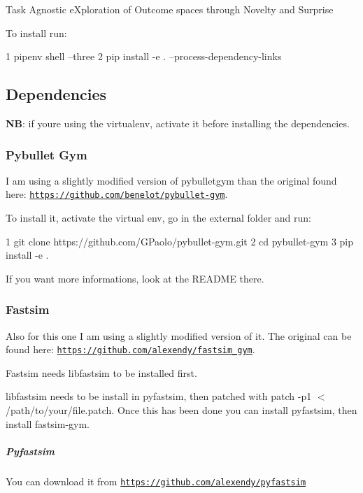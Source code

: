 Task Agnostic e\+Xploration of Outcome spaces through Novelty and Surprise

To install run\+: 
\begin{DoxyCode}
1 pipenv shell --three
2 pip install -e . --process-dependency-links
\end{DoxyCode}


 \subsection*{Dependencies}

{\bfseries NB}\+: if you\textquotesingle{}re using the virtualenv, activate it before installing the dependencies. \subsubsection*{Pybullet Gym}

I am using a slightly modified version of pybulletgym than the original found here\+: {\ttfamily \href{https://github.com/benelot/pybullet-gym}{\tt https\+://github.\+com/benelot/pybullet-\/gym}}.

To install it, activate the virtual env, go in the {\ttfamily external} folder and run\+:


\begin{DoxyCode}
1 git clone https://github.com/GPaolo/pybullet-gym.git
2 cd pybullet-gym
3 pip install -e .
\end{DoxyCode}


If you want more informations, look at the {\ttfamily R\+E\+A\+D\+ME} there.

\subsubsection*{Fastsim}

Also for this one I am using a slightly modified version of it. The original can be found here\+: {\ttfamily \href{https://github.com/alexendy/fastsim_gym}{\tt https\+://github.\+com/alexendy/fastsim\+\_\+gym}}.

Fastsim needs libfastsim to be installed first.

libfastsim needs to be install in pyfastsim, then patched with {\ttfamily patch -\/p1 $<$ /path/to/your/file.patch}. Once this has been done you can install pyfastsim, then install fastsim-\/gym.

\subparagraph*{Pyfastsim}

You can download it from {\ttfamily \href{https://github.com/alexendy/pyfastsim}{\tt https\+://github.\+com/alexendy/pyfastsim}}

